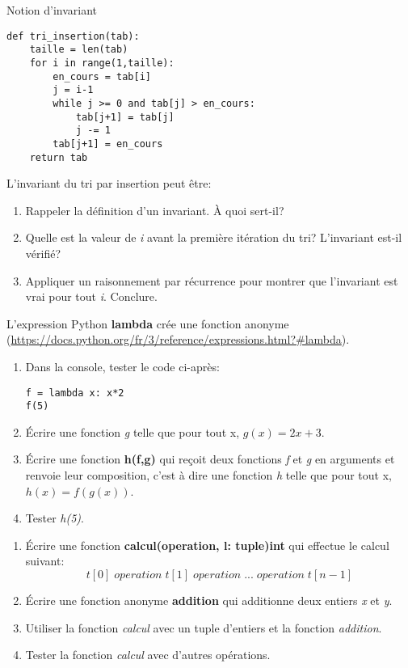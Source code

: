 \documentclass[a4paper,11pt]{article}
\begin{document}
\begin{Form}
\begin{exo}
\begin{enumerate}
\end{enumerate}
\end{exo}
\begin{exo}
Notion d'invariant
\begin{lstlisting}
def tri_insertion(tab):
    taille = len(tab)
    for i in range(1,taille):
        en_cours = tab[i]
        j = i-1
        while j >= 0 and tab[j] > en_cours:
            tab[j+1] = tab[j]
            j -= 1
        tab[j+1] = en_cours
    return tab
\end{lstlisting}
L'invariant du tri par insertion peut être: 
\begin{enumerate}
\item Rappeler la définition d'un invariant. À quoi sert-il?
\item Quelle est la valeur de \emph{i} avant la première itération du tri? L'invariant est-il vérifié?
\item Appliquer un raisonnement par récurrence pour montrer que l'invariant est vrai pour tout \emph{i}. Conclure.
\end{enumerate}
\end{exo}
\begin{exo}
L'expression Python \textbf{lambda} crée une fonction anonyme
(\url{https://docs.python.org/fr/3/reference/expressions.html?#lambda}).
\begin{enumerate}
\item Dans la console, tester le code ci-après:
\begin{lstlisting}
f = lambda x: x*2
f(5)
\end{lstlisting}
\item Écrire une fonction \emph{g} telle que pour tout x, $g(x) = 2x+3$.
\item Écrire une fonction \textbf{h(f,g)} qui reçoit deux fonctions \emph{f} et \emph{g} en arguments et renvoie leur composition, c'est à dire une fonction \emph{h} telle que pour tout x, $h(x)=f(g(x))$.
\item Tester \emph{h(5)}.
\end{enumerate}
\end{exo}
\begin{exo}
\begin{enumerate}
\item Écrire une fonction \textbf{calcul(operation, l: tuple)\;\rightarrow\;int} qui effectue le calcul suivant:
$$t[0]\;operation\;t[1]\;operation\;...\;operation\;t[n-1]$$
\item Écrire une fonction anonyme \textbf{addition} qui additionne deux entiers \emph{x} et \emph{y}.
\item Utiliser la fonction \emph{calcul} avec un tuple d'entiers et la fonction \emph{addition}.
\item Tester la fonction \emph{calcul} avec d'autres opérations.
\end{enumerate}
\end{exo}
\end{Form}
\end{document}
